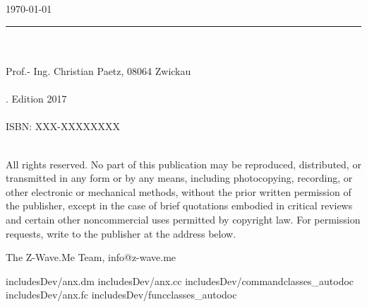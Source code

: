 \documentclass[10pt, pointlessnumbers, twoside=false, normalheadings]{scrbook}
\begin{document}
\begin{titlepage}
\\ 
		\vspace{10mm}
		\\ 
		\vspace{10mm}
	
		\vspace{\fill}	
\date{\today}  	
		\centering \large{\today}\\

\end{titlepage}
\newpage{}
\thispagestyle {empty}


\begin{center}
  

\end{center}
\null\vfill
\noindent\rule{\textwidth}{1pt}
\\
\\
\noindent
\textcopyright  {} Prof.- Ing. Christian Paetz, 08064 Zwickau \\
\\
. Edition 2017 \\
\\
\noindent ISBN: XXX-XXXXXXXX \\
\\
\begin{scriptsize}
\noindent
All rights reserved. No part of this publication may be reproduced, distributed, or 
transmitted in any form or by any means, including photocopying, recording, or other 
electronic or mechanical methods, without the prior written permission of the publisher, 
except in the case of brief quotations embodied in critical reviews and certain other 
noncommercial uses permitted by copyright law. For permission requests, write to the 
publisher at the address below.


\noindent
The Z-Wave.Me Team, info@z-wave.me


\end{scriptsize}
\newpage{}		
		

\newpage{}
\tableofcontents
 
 
 
 
 
 
 







\begin{appendix} 
 {includesDev/anx.dm}
 {includesDev/anx.cc}
 {includesDev/commandclasses_autodoc}
 {includesDev/anx.fc}
 {includesDev/funcclasses_autodoc}
 
\end{appendix} 

\listoftables
\listoffigures
\printindex
\end{document}

